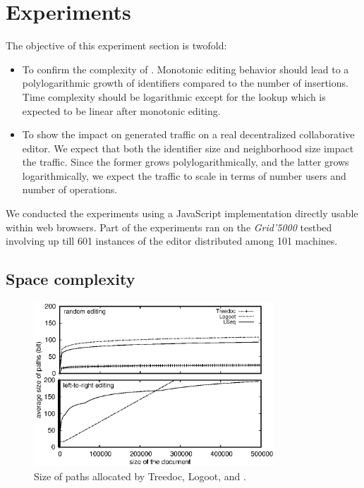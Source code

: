 \section{Experiments}
\label{sec:experiments}

The objective of this experiment section is twofold:
\begin{itemize}
\item To confirm the complexity of \LSEQ. Monotonic editing behavior should lead
  to a polylogarithmic growth of identifiers compared to the number of
  insertions. Time complexity should be logarithmic except for the lookup which
  is expected to be linear after monotonic editing.
\item To show the impact on generated traffic on a real decentralized
  collaborative editor. We expect that both the identifier size and neighborhood
  size impact the traffic. Since the former grows polylogarithmically, and the
  latter grows logarithmically, we expect the traffic to scale in terms of
  number users and number of operations.
\end{itemize}

We conducted the experiments using a JavaScript implementation directly usable
within web browsers. Part of the experiments ran on the \emph{Grid'5000} testbed
involving up till 601 instances of the editor distributed among 101 machines.

\subsection{Space complexity}

\begin{figure}
  \centering
  \includegraphics[width=0.8\textwidth]{./img/space.eps}
  \caption{\label{fig:space}Size of paths allocated by Treedoc, Logoot, and
    \LSEQ.}
\end{figure}

